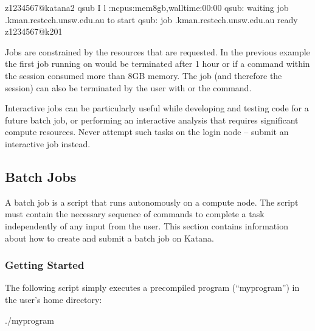 \documentclass[letterpaper,10pt,english]{sphinxmanual}
\begin{document}
\begin{sphinxVerbatim}[commandchars=\\\{\}]
\PYG{o}{[}z1234567@katana2 \PYGZti{}\PYG{o}{]}\PYGZdl{} qsub \PYGZhy{}I \PYGZhy{}l :ncpus:mem8gb,walltime:00:00
qsub: waiting  job .kman.restech.unsw.edu.au to start
qsub: job .kman.restech.unsw.edu.au ready
\PYG{o}{[}z1234567@k201 \PYGZti{}\PYG{o}{]}\PYGZdl{}
\end{sphinxVerbatim}

Jobs are constrained by the resources that are requested. In the previous example the first job \sphinxhyphen{} running on  \sphinxhyphen{} would be terminated after 1 hour or if a command within the session consumed more than 8GB memory. The job (and therefore the session) can also be terminated by the user with  or the  command.

Interactive jobs can be particularly useful while developing and testing code for a future batch job, or performing an interactive analysis that requires significant compute resources. Never attempt such tasks on the login node – submit an interactive job instead.


\subsection{Batch Jobs}
\label{\detokenize{using_katana/running_jobs:batch-jobs}}\label{\detokenize{using_katana/running_jobs:id1}}
A batch job is a script that runs autonomously on a compute node. The script must contain the necessary sequence of commands to complete a task independently of any input from the user. This section contains information about how to create and submit a batch job on Katana.


\subsubsection{Getting Started}
\label{\detokenize{using_katana/running_jobs:getting-started}}
The following script simply executes a pre\sphinxhyphen{}compiled program (“myprogram”) in the user’s home directory:

\begin{sphinxVerbatim}[commandchars=\\\{\}]

 

./myprogram
\end{sphinxVerbatim}
\end{document}
